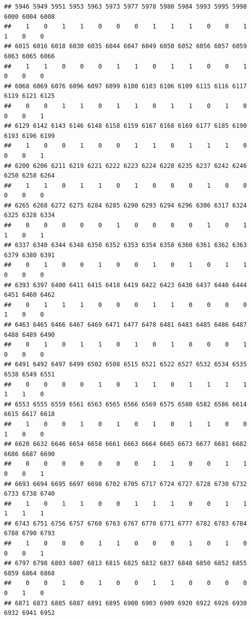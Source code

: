 \documentclass[
]{article}
\begin{document}
\begin{verbatim}
## 5946 5949 5951 5953 5963 5973 5977 5978 5980 5984 5993 5995 5998 6000 6004 6008 
##    1    0    1    1    0    0    0    1    1    1    0    0    1    1    0    0 
## 6015 6016 6018 6030 6035 6044 6047 6049 6050 6052 6056 6057 6059 6063 6065 6066 
##    1    1    0    0    0    1    1    0    1    1    0    0    1    0    0    0 
## 6068 6069 6076 6096 6097 6099 6100 6103 6106 6109 6115 6116 6117 6119 6121 6125 
##    0    0    1    1    0    1    1    0    1    1    0    1    0    0    0    1 
## 6129 6142 6143 6146 6148 6158 6159 6167 6168 6169 6177 6185 6190 6193 6196 6199 
##    1    0    0    1    0    0    1    1    0    1    1    1    0    0    0    1 
## 6200 6206 6211 6219 6221 6222 6223 6224 6228 6235 6237 6242 6246 6250 6258 6264 
##    1    1    0    1    1    0    1    0    0    0    1    0    0    0    0    0 
## 6265 6268 6272 6275 6284 6285 6290 6293 6294 6296 6306 6317 6324 6325 6328 6334 
##    0    0    0    0    0    1    0    0    0    0    1    0    1    1    0    1 
## 6337 6340 6344 6348 6350 6352 6353 6354 6358 6360 6361 6362 6363 6379 6380 6391 
##    0    1    0    0    1    0    0    1    0    1    0    1    1    0    0    0 
## 6393 6397 6400 6411 6415 6418 6419 6422 6423 6430 6437 6440 6444 6451 6460 6462 
##    0    1    1    1    0    0    0    1    1    0    0    0    0    1    0    0 
## 6463 6465 6466 6467 6469 6471 6477 6478 6481 6483 6485 6486 6487 6488 6489 6490 
##    0    1    0    1    1    0    1    0    1    0    0    0    1    0    0    0 
## 6491 6492 6497 6499 6502 6508 6515 6521 6522 6527 6532 6534 6535 6538 6549 6551 
##    0    0    0    0    1    0    1    1    0    1    1    1    1    1    1    0 
## 6553 6555 6559 6561 6563 6565 6566 6569 6575 6580 6582 6586 6614 6615 6617 6618 
##    1    0    0    1    0    1    0    1    0    1    1    0    0    1    0    0 
## 6620 6632 6646 6654 6658 6661 6663 6664 6665 6673 6677 6681 6682 6686 6687 6690 
##    0    0    0    0    0    0    0    1    1    0    0    1    1    0    0    1 
## 6693 6694 6695 6697 6698 6702 6705 6717 6724 6727 6728 6730 6732 6733 6738 6740 
##    1    0    1    1    0    0    1    1    1    0    0    1    1    1    1    1 
## 6743 6751 6756 6757 6760 6763 6767 6770 6771 6777 6782 6783 6784 6788 6790 6793 
##    1    0    0    0    1    1    0    0    0    1    0    1    0    0    0    1 
## 6797 6798 6803 6807 6813 6815 6825 6832 6837 6848 6850 6852 6855 6859 6864 6868 
##    0    0    1    0    1    0    0    1    1    0    0    0    0    0    1    0 
## 6871 6873 6885 6887 6891 6895 6900 6903 6909 6920 6922 6926 6930 6932 6941 6952 

\end{verbatim}
\end{document}
